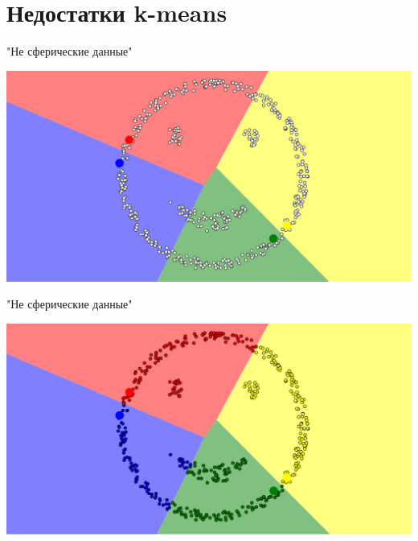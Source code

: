 \documentclass[10pt]{beamer}
\begin{document}


\section{Недостатки k-means}

\begin{frame}{"Не сферические данные"}
	\begin{center}
	  \includegraphics[width=\textwidth, keepaspectratio = true]{images/non_spherical-1}  
	\end{center}
\end{frame}	

\begin{frame}{"Не сферические данные"}
	\begin{center}
	  \includegraphics[width=\textwidth, keepaspectratio = true]{images/non_spherical-2}  
	\end{center}
\end{frame}	
\end{document}
